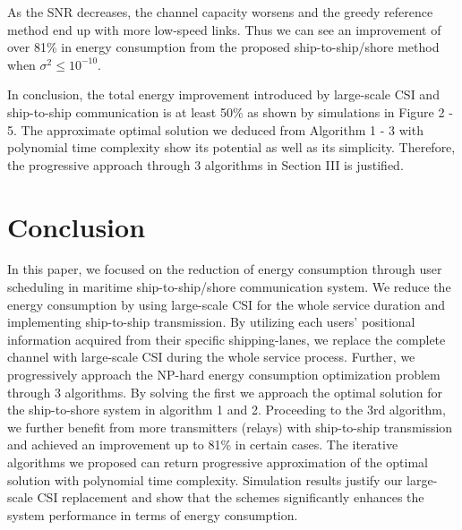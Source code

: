 \documentclass[conference]{IEEEtran}
\begin{document}

As the SNR decreases, the channel capacity worsens and the greedy reference method end up with more low-speed links. Thus we can see an improvement of over 81\% in energy consumption from the proposed ship-to-ship/shore method when ${\sigma ^2 \le{10^{ - 10}}}$.

In conclusion, the total energy improvement introduced by large-scale CSI and ship-to-ship communication is at least 50\% as shown by simulations in Figure 2 - 5. The approximate optimal solution we deduced from Algorithm 1 - 3 with polynomial time complexity show its potential as well as its simplicity. Therefore, the progressive approach through 3 algorithms in Section III is justified. 

\section{Conclusion}\label{sec:5}

In this paper, we focused on the reduction of energy consumption through user scheduling in maritime ship-to-ship/shore communication system. 
We reduce the energy consumption by using large-scale CSI for the whole service duration and implementing ship-to-ship transmission. 
By utilizing each users' positional information acquired from their specific shipping-lanes, we replace the complete channel with large-scale CSI during the whole service process. Further, we progressively approach the NP-hard energy consumption optimization problem through 3 algorithms. By solving the first we approach the optimal solution for the ship-to-shore system in algorithm 1 and 2. %
Proceeding to the 3rd algorithm, we further benefit from more transmitters (relays) with ship-to-ship transmission and achieved an improvement up to 81\% in certain cases. %
The iterative algorithms we proposed can return progressive approximation of the optimal solution with polynomial time complexity. Simulation results justify our large-scale CSI replacement and show that the schemes significantly enhances the system performance in terms of energy consumption.
\end{document}

